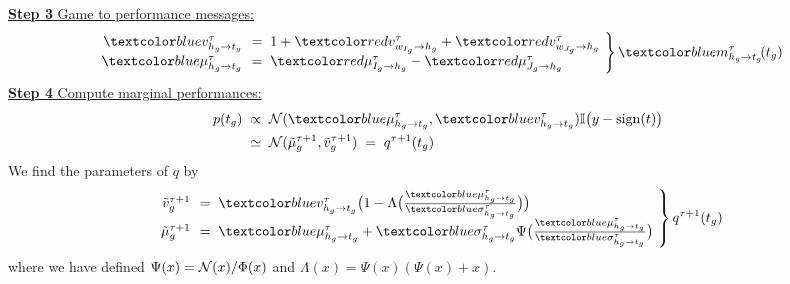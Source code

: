 \begin{frame}
\underline{{\bf Step 3} Game to performance messages:}
\[
\left.\begin{array}{rl}
\Blue{v^\tau_{h_g\rightarrow t_g}}\!\!&=\;
1+\Red{v^\tau_{w_{I_g}\rightarrow h_g}}+\Red{v^\tau_{w_{J_g}\rightarrow h_g}}\\
\Blue{\mu^\tau_{h_g\rightarrow t_g}}\!\!&=\;
\Red{\mu^\tau_{I_g\rightarrow h_g}}-\Red{\mu^\tau_{J_g\rightarrow h_g}}
\end{array}\!\right\} \Blue{m^\tau_{h_g\rightarrow t_g}\!(t_g)}
\]
\underline{{\bf Step 4} Compute marginal performances:}
\[
\begin{split}
p(t_g)\;&\propto\;\N(\Blue{\mu^\tau_{h_g\rightarrow
  t_g}},\Blue{v^\tau_{h_g\rightarrow t_g}}){\mathbb
  I}\big(y-\operatorname{sign}(t)\big)\\
&\simeq\;\N(\tilde\mu^{\tau+1}_g, \tilde v^{\tau+1}_g)\;=\;q^{\tau+1}(t_g)
\end{split}
\]
We find the parameters of $q$ by 
\[
\left.\begin{array}{rl}
\tilde v^{\tau+1}_g\!\!&=\;\Blue{v^\tau_{h_g\rightarrow t_g}}
\big(1-\Lambda\big(\frac{\Blue{\mu^\tau_{h_g\rightarrow
      t_g}}}{\Blue{\sigma^\tau_{h_g\rightarrow t_g}}}\big)\big)\\
\tilde\mu^{\tau+1}_g\!\!&=\;\Blue{\mu^\tau_{h_g\rightarrow t_g}}+\Blue{\sigma^\tau_{h_g\rightarrow t_g}}
\Psi\big(\frac{\Blue{\mu^\tau_{h_g\rightarrow  t_g}}}{\Blue{\sigma^\tau_{h_g\rightarrow t_g}}}\big)
\end{array}\!\right\}q^{\tau+1}(t_g)
\]
where we have defined $\Psi(x)=\mathcal{N}(x)/\Phi(x)$ and $\Lambda(x)=\Psi(x)(\Psi(x)+x)$.
\end{frame}


